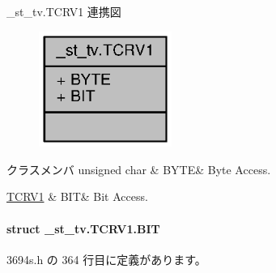 \+\_\+st\+\_\+tv.\+T\+C\+R\+V1 連携図
\nopagebreak
\begin{figure}[H]
\begin{center}
\leavevmode
\includegraphics[width=123pt]{df/d99/union__st__tv_8TCRV1__coll__graph}
\end{center}
\end{figure}
\begin{DoxyFields}{クラスメンバ}
unsigned char\label{3694s_8h_ae409eb2ba6eb6801f52763ae370c350e}
&
B\+Y\+T\+E&
Byte Access. \\
\hline

\hyperlink{3694s_8h_d1/dc1/struct__st__tv_8TCRV1_8BIT}{T\+C\+R\+V1}\label{3694s_8h_adb957fdc8000e1eef04a243f5199aa52}
&
B\+I\+T&
Bit Access. \\
\hline

\end{DoxyFields}
\label{struct__st__tv_8TCRV1_8BIT}
\paragraph{struct \+\_\+st\+\_\+tv.\+T\+C\+R\+V1.\+B\+I\+T}


 3694s.\+h の 364 行目に定義があります。



